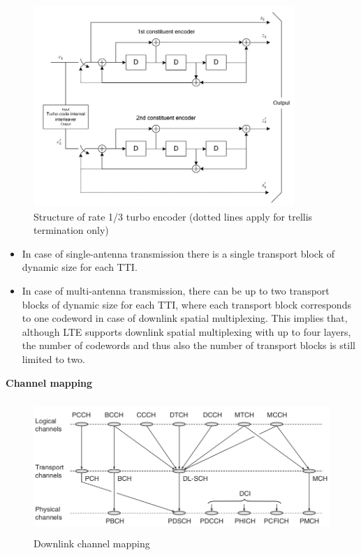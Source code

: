 \documentclass[titlepage]{article}
\numberwithin{figure}{section}
\numberwithin{equation}{section}
\begin{document}
\begin{figure}[htbp]
	\centering
	\includegraphics[height=3in]{turbo}
	\caption{Structure of rate 1/3 turbo encoder (dotted lines apply for trellis termination only)}
\end{figure}



\begin{itemize}
	\item In case of single-antenna transmission there is a single transport block of dynamic size for each TTI.

	\item In case of multi-antenna transmission, there can be up to two transport blocks of dynamic size for each TTI, where each transport block corresponds to one codeword in case of downlink spatial multiplexing. This implies that, although LTE supports downlink spatial multiplexing with up to four layers, the number of codewords and thus also the number of transport blocks is still limited to two.
\end{itemize}

\textbf{Channel mapping}

\begin{figure}[htbp]
	\centering
	\includegraphics[height=2in]{DLCH}
	\caption{Downlink channel mapping}
\end{figure}
\end{document}
